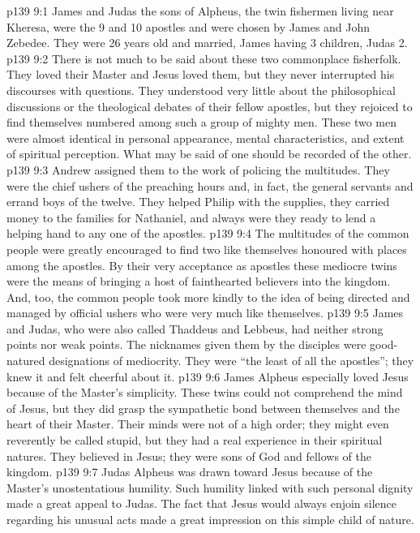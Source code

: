 \vs p139 9:1 James and Judas the sons of Alpheus, the twin fishermen living near Kheresa, were the 9 and 10 apostles and were chosen by James and John Zebedee. They were 26 years old and married, James having 3 children, Judas 2.
\vs p139 9:2 \pc There is not much to be said about these two commonplace fisherfolk. They loved their Master and Jesus loved them, but they never interrupted his discourses with questions. They understood very little about the philosophical discussions or the theological debates of their fellow apostles, but they rejoiced to find themselves numbered among such a group of mighty men. These two men were almost identical in personal appearance, mental characteristics, and extent of spiritual perception. What may be said of one should be recorded of the other.
\vs p139 9:3 Andrew assigned them to the work of policing the multitudes. They were the chief ushers of the preaching hours and, in fact, the general servants and errand boys of the twelve. They helped Philip with the supplies, they carried money to the families for Nathaniel, and always were they ready to lend a helping hand to any one of the apostles.
\vs p139 9:4 The multitudes of the common people were greatly encouraged to find two like themselves honoured with places among the apostles. By their very acceptance as apostles these mediocre twins were the means of bringing a host of fainthearted believers into the kingdom. And, too, the common people took more kindly to the idea of being directed and managed by official ushers who were very much like themselves.
\vs p139 9:5 James and Judas, who were also called Thaddeus and Lebbeus, had neither strong points nor weak points. The nicknames given them by the disciples were good\hyp{}natured designations of mediocrity. They were “the least of all the apostles”; they knew it and felt cheerful about it.
\vs p139 9:6 \pc James Alpheus especially loved Jesus because of the Master’s simplicity. These twins could not comprehend the mind of Jesus, but they did grasp the sympathetic bond between themselves and the heart of their Master. Their minds were not of a high order; they might even reverently be called stupid, but they had a real experience in their spiritual natures. They believed in Jesus; they were sons of God and fellows of the kingdom.
\vs p139 9:7 Judas Alpheus was drawn toward Jesus because of the Master’s unostentatious humility. Such humility linked with such personal dignity made a great appeal to Judas. The fact that Jesus would always enjoin silence regarding his unusual acts made a great impression on this simple child of nature.

